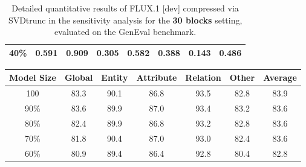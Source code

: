 \begin{table}[H]
{\begin{tabular}{cccccccc}
			40\% &    %
			0.591 &    %
			0.909 &    %
			0.305 &    %
			0.582 &    %
			0.388 &    %
			0.143 &    %
			0.486     %
			\\
		
			\bottomrule
		\end{tabular}
	}
	\smallskip
	\caption[SVDtrunc Sensitivity Analysis 30 Blocks: Detailed GenEval Results]{Detailed quantitative results of FLUX.1 {[dev]} compressed via \gls{SVD}trunc in the sensitivity analysis for the \textbf{30 blocks} setting, evaluated on the GenEval benchmark.}
	\label{tab:geneval_30blocks}
\end{table}


\begin{table}[H]
	\centering
	{%
		
		\begin{tabular}{ccccccc}
			\toprule
			\multicolumn{1}{c}{\textbf{Model Size}} &
			\multicolumn{1}{c}{Global} &
			\multicolumn{1}{c}{Entity} &
			\multicolumn{1}{c}{Attribute} &
			\multicolumn{1}{c}{Relation} &
			\multicolumn{1}{c}{Other} &
			\multicolumn{1}{c}{Average}\\
			\midrule
			\color{gray} 100  %
			& \color{gray} 83.3  %
			& \color{gray} 90.1  %
			& \color{gray} 86.8  %
			& \color{gray} 93.5  %
			& \color{gray} 82.8  %
			& \color{gray} 83.9  %
			\\
			\midrule
			
						90\% &    %
						83.6 &    %
						89.9 &    %
						87.0 &    %
						93.4 &    %
						83.2 &    %
						83.6     %
						\\
					
						80\% &    %
						82.4 &    %
						89.9 &    %
						86.8 &    %
						93.2 &    %
						82.8 &    %
						83.6     %
						\\
			
			70\% &    %
			81.8 &    %
			90.4 &    %
			87.0 &    %
			93.0 &    %
			82.4 &    %
			83.6    %
			\\
			
			60\% &    %
			80.9 &    %
			89.4 &    %
			86.4 &    %
			92.8 &    %
			80.4 &    %
			82.8     %
			\\
			

\end{tabular}}
\end{table}
